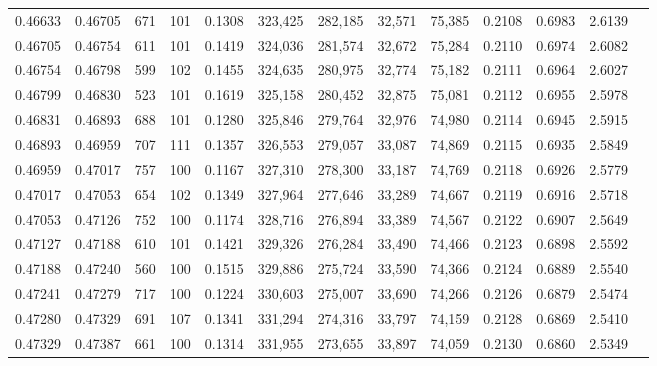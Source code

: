 \begin{tabular}{rrrrrrrrrrrrr}
0.46633 & 0.46705 &   671 & 101 &                                     0.1308 & 323,425 & 282,185 &  32,571 &  75,385 & 0.2108 & 0.6983 & 2.6139 \\
0.46705 & 0.46754 &   611 & 101 &                                     0.1419 & 324,036 & 281,574 &  32,672 &  75,284 & 0.2110 & 0.6974 & 2.6082 \\
0.46754 & 0.46798 &   599 & 102 &                                     0.1455 & 324,635 & 280,975 &  32,774 &  75,182 & 0.2111 & 0.6964 & 2.6027 \\
0.46799 & 0.46830 &   523 & 101 &                                     0.1619 & 325,158 & 280,452 &  32,875 &  75,081 & 0.2112 & 0.6955 & 2.5978 \\
0.46831 & 0.46893 &   688 & 101 &                                     0.1280 & 325,846 & 279,764 &  32,976 &  74,980 & 0.2114 & 0.6945 & 2.5915 \\
0.46893 & 0.46959 &   707 & 111 &                                     0.1357 & 326,553 & 279,057 &  33,087 &  74,869 & 0.2115 & 0.6935 & 2.5849 \\
0.46959 & 0.47017 &   757 & 100 &                                     0.1167 & 327,310 & 278,300 &  33,187 &  74,769 & 0.2118 & 0.6926 & 2.5779 \\
0.47017 & 0.47053 &   654 & 102 &                                     0.1349 & 327,964 & 277,646 &  33,289 &  74,667 & 0.2119 & 0.6916 & 2.5718 \\
0.47053 & 0.47126 &   752 & 100 &                                     0.1174 & 328,716 & 276,894 &  33,389 &  74,567 & 0.2122 & 0.6907 & 2.5649 \\
0.47127 & 0.47188 &   610 & 101 &                                     0.1421 & 329,326 & 276,284 &  33,490 &  74,466 & 0.2123 & 0.6898 & 2.5592 \\
0.47188 & 0.47240 &   560 & 100 &                                     0.1515 & 329,886 & 275,724 &  33,590 &  74,366 & 0.2124 & 0.6889 & 2.5540 \\
0.47241 & 0.47279 &   717 & 100 &                                     0.1224 & 330,603 & 275,007 &  33,690 &  74,266 & 0.2126 & 0.6879 & 2.5474 \\
0.47280 & 0.47329 &   691 & 107 &                                     0.1341 & 331,294 & 274,316 &  33,797 &  74,159 & 0.2128 & 0.6869 & 2.5410 \\
0.47329 & 0.47387 &   661 & 100 &                                     0.1314 & 331,955 & 273,655 &  33,897 &  74,059 & 0.2130 & 0.6860 & 2.5349 \\

\end{tabular}
